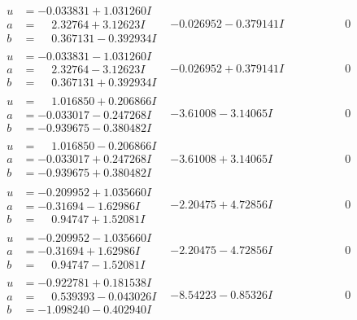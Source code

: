\documentclass[1p]{elsarticle_modified}
\theoremstyle{definition}
\begin{document}
$$\begin{array}{c|c|c}
\begin{aligned}
u &= -0.033831 + 1.031260 I \\
a &= \phantom{-}2.32764 + 3.12623 I \\
b &= \phantom{-}0.367131 - 0.392934 I\end{aligned}
 & -0.026952 - 0.379141 I & \phantom{-0.000000 } 0 \\ \hline\begin{aligned}
u &= -0.033831 - 1.031260 I \\
a &= \phantom{-}2.32764 - 3.12623 I \\
b &= \phantom{-}0.367131 + 0.392934 I\end{aligned}
 & -0.026952 + 0.379141 I & \phantom{-0.000000 } 0 \\ \hline\begin{aligned}
u &= \phantom{-}1.016850 + 0.206866 I \\
a &= -0.033017 - 0.247268 I \\
b &= -0.939675 - 0.380482 I\end{aligned}
 & -3.61008 - 3.14065 I & \phantom{-0.000000 } 0 \\ \hline\begin{aligned}
u &= \phantom{-}1.016850 - 0.206866 I \\
a &= -0.033017 + 0.247268 I \\
b &= -0.939675 + 0.380482 I\end{aligned}
 & -3.61008 + 3.14065 I & \phantom{-0.000000 } 0 \\ \hline\begin{aligned}
u &= -0.209952 + 1.035660 I \\
a &= -0.31694 - 1.62986 I \\
b &= \phantom{-}0.94747 + 1.52081 I\end{aligned}
 & -2.20475 + 4.72856 I & \phantom{-0.000000 } 0 \\ \hline\begin{aligned}
u &= -0.209952 - 1.035660 I \\
a &= -0.31694 + 1.62986 I \\
b &= \phantom{-}0.94747 - 1.52081 I\end{aligned}
 & -2.20475 - 4.72856 I & \phantom{-0.000000 } 0 \\ \hline\begin{aligned}
u &= -0.922781 + 0.181538 I \\
a &= \phantom{-}0.539393 - 0.043026 I \\
b &= -1.098240 - 0.402940 I\end{aligned}
 & -8.54223 - 0.85326 I & \phantom{-0.000000 } 0 \\ \hline\begin{aligned}

\end{aligned}
\end{array}$$
\end{document}
